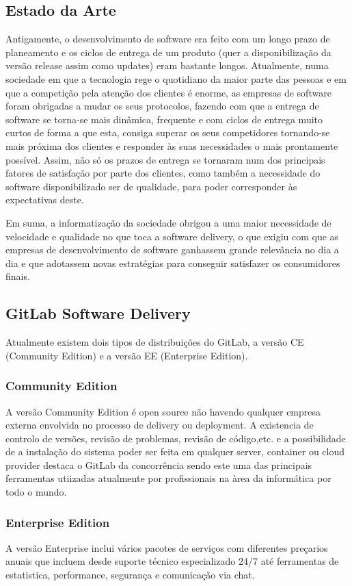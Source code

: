 \documentclass[12pt,a4paper]{article}
\begin{document}
\subsection{Estado da Arte}
Antigamente, o desenvolvimento de software era feito com um longo prazo de planeamento e os ciclos de entrega de um produto (quer a disponibilização da versão release assim como updates) eram bastante longos. Atualmente, numa sociedade em que a tecnologia rege o quotidiano da maior parte das pessoas e em que a competição pela atenção dos clientes é enorme, as empresas de software foram obrigadas a mudar os seus protocolos, fazendo com que a entrega de software se torna-se mais dinâmica, frequente e com ciclos de entrega muito curtos de forma a que esta, consiga superar os seus competidores tornando-se mais próxima dos clientes e responder às suas necessidades o mais prontamente possível. Assim, não só os prazos de entrega se tornaram num dos principais fatores de satisfação por parte dos clientes, como também a necessidade do software disponibilizado ser de qualidade, para poder corresponder às expectativas deste.
\par Em suma, a informatização da sociedade obrigou a uma maior necessidade de velocidade e qualidade no que toca a software delivery, o que exigiu com que as empresas de desenvolvimento de software ganhassem grande relevância no dia a dia e que adotassem novas estratégias para conseguir satisfazer os consumidores finais. 

\subsection{GitLab Software Delivery}
Atualmente existem dois tipos de distribuições do GitLab, a versão CE (Community Edition) e a versão EE (Enterprise Edition). 

\subsubsection{Community Edition}
A versão Community Edition é open source não havendo qualquer empresa externa envolvida no processo de delivery ou deployment. A existencia de controlo de versões, revisão de problemas, revisão de código,etc. e a possibilidade de a instalação do sistema poder ser feita em qualquer server, container ou cloud provider destaca o GitLab da concorrência sendo este uma das principais ferramentas utiizadas atualmente por profissionais na àrea da informática por todo o mundo.

\subsubsection{Enterprise Edition}
A versão Enterprise inclui vários pacotes de serviços com diferentes preçarios anuais que incluem desde suporte técnico especializado 24/7 até ferramentas de estatistica, performance, segurança e comunicação via chat.
\end{document}

